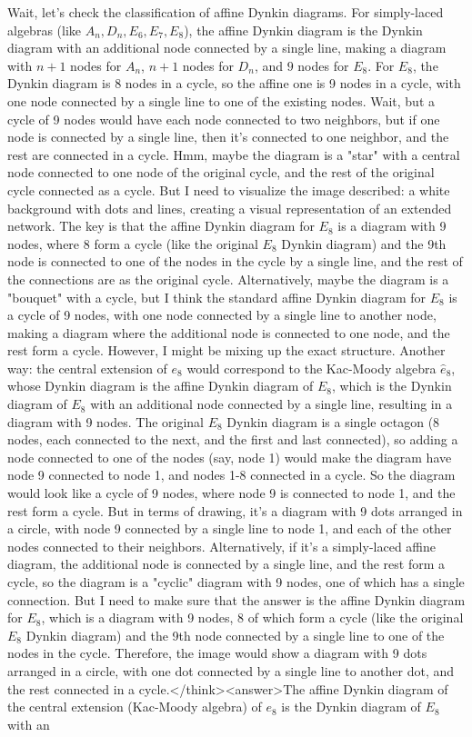 Wait, let's check the classification of affine Dynkin diagrams. For simply-laced algebras (like \( A_n, D_n, E_6, E_7, E_8 \)), the affine Dynkin diagram is the Dynkin diagram with an additional node connected by a single line, making a diagram with \( n+1 \) nodes for \( A_n \), \( n+1 \) nodes for \( D_n \), and \( 9 \) nodes for \( E_8 \). For \( E_8 \), the Dynkin diagram is 8 nodes in a cycle, so the affine one is 9 nodes in a cycle, with one node connected by a single line to one of the existing nodes. Wait, but a cycle of 9 nodes would have each node connected to two neighbors, but if one node is connected by a single line, then it's connected to one neighbor, and the rest are connected in a cycle. Hmm, maybe the diagram is a "star" with a central node connected to one node of the original cycle, and the rest of the original cycle connected as a cycle. But I need to visualize the image described: a white background with dots and lines, creating a visual representation of an extended network. The key is that the affine Dynkin diagram for \( E_8 \) is a diagram with 9 nodes, where 8 form a cycle (like the original \( E_8 \) Dynkin diagram) and the 9th node is connected to one of the nodes in the cycle by a single line, and the rest of the connections are as the original cycle. Alternatively, maybe the diagram is a "bouquet" with a cycle, but I think the standard affine Dynkin diagram for \( E_8 \) is a cycle of 9 nodes, with one node connected by a single line to another node, making a diagram where the additional node is connected to one node, and the rest form a cycle. However, I might be mixing up the exact structure. Another way: the central extension of \( e_8 \) would correspond to the Kac-Moody algebra \( \hat{e}_8 \), whose Dynkin diagram is the affine Dynkin diagram of \( E_8 \), which is the Dynkin diagram of \( E_8 \) with an additional node connected by a single line, resulting in a diagram with 9 nodes. The original \( E_8 \) Dynkin diagram is a single octagon (8 nodes, each connected to the next, and the first and last connected), so adding a node connected to one of the nodes (say, node 1) would make the diagram have node 9 connected to node 1, and nodes 1-8 connected in a cycle. So the diagram would look like a cycle of 9 nodes, where node 9 is connected to node 1, and the rest form a cycle. But in terms of drawing, it's a diagram with 9 dots arranged in a circle, with node 9 connected by a single line to node 1, and each of the other nodes connected to their neighbors. Alternatively, if it's a simply-laced affine diagram, the additional node is connected by a single line, and the rest form a cycle, so the diagram is a "cyclic" diagram with 9 nodes, one of which has a single connection. But I need to make sure that the answer is the affine Dynkin diagram for \( E_8 \), which is a diagram with 9 nodes, 8 of which form a cycle (like the original \( E_8 \) Dynkin diagram) and the 9th node connected by a single line to one of the nodes in the cycle. Therefore, the image would show a diagram with 9 dots arranged in a circle, with one dot connected by a single line to another dot, and the rest connected in a cycle.</think><answer>The affine Dynkin diagram of the central extension (Kac-Moody algebra) of \( e_8 \) is the Dynkin diagram of \( E_8 \) with an 